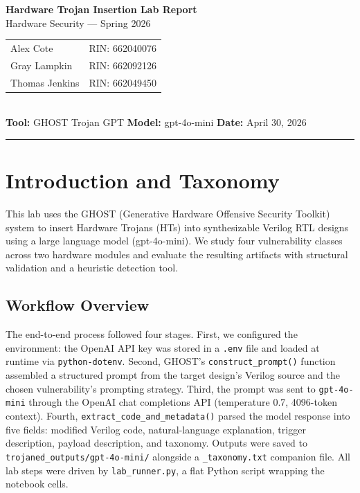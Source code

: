 \documentclass[11pt]{article}
\begin{document}
\sloppy

\begin{center}
  {\Large\bfseries Hardware Trojan Insertion Lab Report}\\[4pt]
  {\normalsize Hardware Security --- Spring 2026}\\[6pt]
  \begin{tabular}{@{}l l@{}}
     {Alex Cote} & RIN: {662040076} \\
     {Gray Lampkin} & RIN: {662092126} \\
     {Thomas Jenkins} & RIN: {662049450}\\
  \end{tabular}\\[4pt]
  \textbf{Tool:} GHOST Trojan GPT \quad \textbf{Model:} gpt-4o-mini \quad \textbf{Date:} April 30, 2026
\end{center}
\vspace{4pt}
\hrule
\vspace{8pt}

\section{Introduction and Taxonomy}
\label{sec:taxonomy}

This lab uses the GHOST (Generative Hardware Offensive Security Toolkit) system to insert Hardware Trojans (HTs) into synthesizable Verilog RTL designs using a large language model (gpt-4o-mini). We study four vulnerability classes across two hardware modules and evaluate the resulting artifacts with structural validation and a heuristic detection tool.

\subsection{Workflow Overview}

The end-to-end process followed four stages. First, we configured the environment: the OpenAI API key was stored in a \texttt{.env} file and loaded at runtime via \texttt{python-dotenv}. Second, GHOST's \texttt{construct\_prompt()} function assembled a structured prompt from the target design's Verilog source and the chosen vulnerability's prompting strategy. Third, the prompt was sent to \texttt{gpt-4o-mini} through the OpenAI chat completions API (temperature 0.7, 4096-token context). Fourth, \texttt{extract\_code\_and\_metadata()} parsed the model response into five fields: modified Verilog code, natural-language explanation, trigger description, payload description, and taxonomy. Outputs were saved to \texttt{trojaned\_outputs/gpt-4o-mini/} alongside a \texttt{\_taxonomy.txt} companion file. All lab steps were driven by \texttt{lab\_runner.py}, a flat Python script wrapping the notebook cells.
\end{document}
